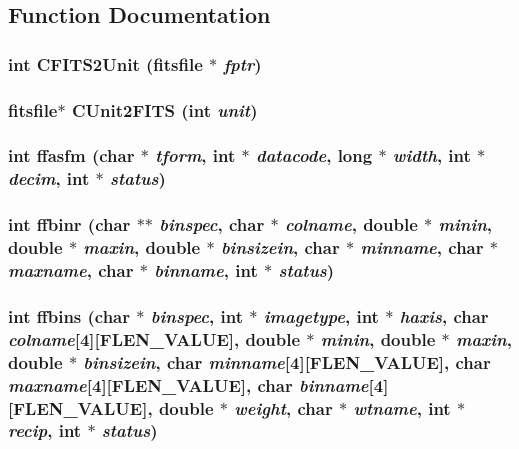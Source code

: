 \subsection{Function Documentation}
\subsubsection{\setlength{\rightskip}{0pt plus 5cm}int CFITS2Unit (\bf{fitsfile} $\ast$ {\em fptr})}\label{src_2fitsio_8h_a383c3ad43a5dcb71a954e5b6ab7cdde}


\subsubsection{\setlength{\rightskip}{0pt plus 5cm}\bf{fitsfile}$\ast$ CUnit2FITS (int {\em unit})}\label{src_2fitsio_8h_e08abd96bc54834ccfe5441c26d459de}


\subsubsection{\setlength{\rightskip}{0pt plus 5cm}int ffasfm (char $\ast$ {\em tform}, int $\ast$ {\em datacode}, long $\ast$ {\em width}, int $\ast$ {\em decim}, int $\ast$ {\em status})}\label{src_2fitsio_8h_e10ab520ca972149eb9fafabd21a1606}


\subsubsection{\setlength{\rightskip}{0pt plus 5cm}int ffbinr (char $\ast$$\ast$ {\em binspec}, char $\ast$ {\em colname}, double $\ast$ {\em minin}, double $\ast$ {\em maxin}, double $\ast$ {\em binsizein}, char $\ast$ {\em minname}, char $\ast$ {\em maxname}, char $\ast$ {\em binname}, int $\ast$ {\em status})}\label{src_2fitsio_8h_f9daf75aaa15d49359ba6fe025e80b86}


\subsubsection{\setlength{\rightskip}{0pt plus 5cm}int ffbins (char $\ast$ {\em binspec}, int $\ast$ {\em imagetype}, int $\ast$ {\em haxis}, char {\em colname}[4][FLEN\_\-VALUE], double $\ast$ {\em minin}, double $\ast$ {\em maxin}, double $\ast$ {\em binsizein}, char {\em minname}[4][FLEN\_\-VALUE], char {\em maxname}[4][FLEN\_\-VALUE], char {\em binname}[4][FLEN\_\-VALUE], double $\ast$ {\em weight}, char $\ast$ {\em wtname}, int $\ast$ {\em recip}, int $\ast$ {\em status})}\label{src_2fitsio_8h_25532ba78224456d371c8724bdbc485f}


